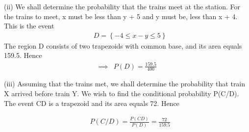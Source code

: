\documentclass[journal,12pt,twocolumn]{beamer}
\providecommand{\cbrak}[1]{\ensuremath{\left\{#1\right\}}}
\begin{document}
	\begin{frame}
	 (ii)	We shall determine the probability that the trains meet at the station. For the
		trains to meet, x must be less than y + 5 and y must be, less than x + 4. This is the event
		\begin{align}
			&D = \cbrak{-4 \leq x-y \leq 5} \nonumber
		\end{align} 
		The region D consists of two trapezoids with common base, and its area equals 159.5. Hence 
		\begin{align}
			\implies    &P(D) = \frac{159.5}{400} 
		\end{align}
	\end{frame}
 \begin{frame}
 	(iii) Assuming that the trains met, we shall determine the probability that train X
 	arrived before train Y. We wish to find the conditional probability P(C/D). The event
 	CD is a trapezoid and its area equals 72. Hence
 	
 	\begin{align}
 		&P(C/D) = \frac{P(CD)}{P(D)} =\frac{72}{159.5}
 	\end{align}  
\end{frame}
	
\end{document}
